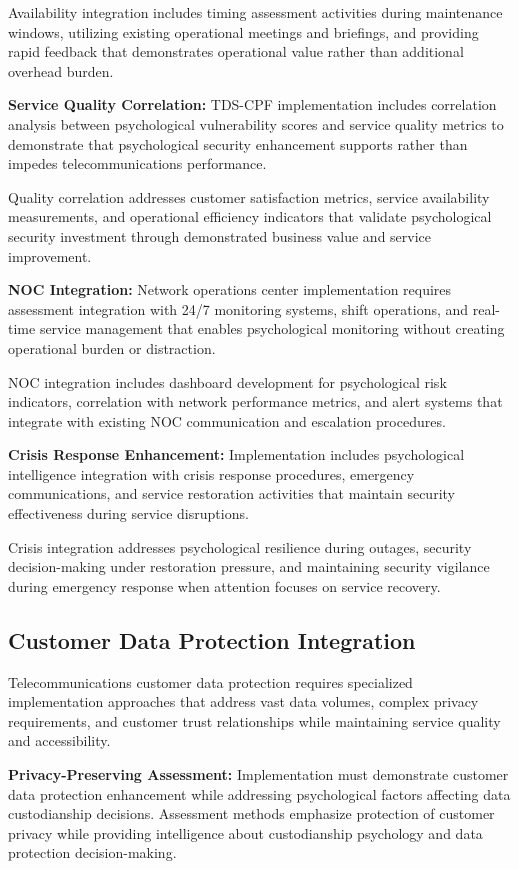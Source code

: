 \documentclass[10pt, twocolumn]{article}
\begin{document}
Availability integration includes timing assessment activities during maintenance windows, utilizing existing operational meetings and briefings, and providing rapid feedback that demonstrates operational value rather than additional overhead burden.

\textbf{Service Quality Correlation:} TDS-CPF implementation includes correlation analysis between psychological vulnerability scores and service quality metrics to demonstrate that psychological security enhancement supports rather than impedes telecommunications performance.

Quality correlation addresses customer satisfaction metrics, service availability measurements, and operational efficiency indicators that validate psychological security investment through demonstrated business value and service improvement.

\textbf{NOC Integration:} Network operations center implementation requires assessment integration with 24/7 monitoring systems, shift operations, and real-time service management that enables psychological monitoring without creating operational burden or distraction.

NOC integration includes dashboard development for psychological risk indicators, correlation with network performance metrics, and alert systems that integrate with existing NOC communication and escalation procedures.

\textbf{Crisis Response Enhancement:} Implementation includes psychological intelligence integration with crisis response procedures, emergency communications, and service restoration activities that maintain security effectiveness during service disruptions.

Crisis integration addresses psychological resilience during outages, security decision-making under restoration pressure, and maintaining security vigilance during emergency response when attention focuses on service recovery.

\subsection{Customer Data Protection Integration}

Telecommunications customer data protection requires specialized implementation approaches that address vast data volumes, complex privacy requirements, and customer trust relationships while maintaining service quality and accessibility.

\textbf{Privacy-Preserving Assessment:} Implementation must demonstrate customer data protection enhancement while addressing psychological factors affecting data custodianship decisions. Assessment methods emphasize protection of customer privacy while providing intelligence about custodianship psychology and data protection decision-making.
\end{document}
